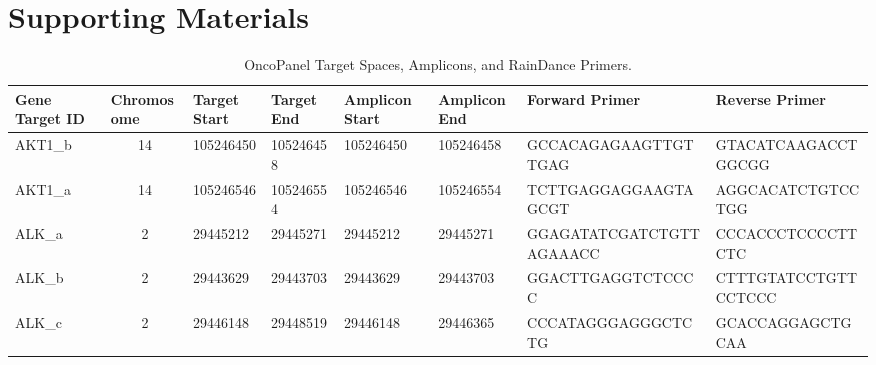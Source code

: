 \chapter{Supporting Materials}

\footnotesize
\begin{landscape}
\setlength\LTleft{0pt}
\setlength\LTright{0pt}
\begin{longtable}{| p{} | p{} | p{} | p{} | p{} | p{} | p{} | p{} |}
\caption{OncoPanel Target Spaces, Amplicons, and RainDance Primers.}
\label{tbl:amplicon:list}
\hline
\textbf{Gene Target ID}          & \textbf{Chromosome}     & \textbf{Target Start}          & \textbf{Target End}            & \textbf{Amplicon Start}        & \textbf{Amplicon End}          & \textbf{Forward Primer}                              & \textbf{Reverse Primer}                            \\ \hline
\multicolumn{1}{|l|}{AKT1\_b}    & \multicolumn{1}{c|}{14} & \multicolumn{1}{l|}{105246450} & \multicolumn{1}{l|}{105246458} & \multicolumn{1}{l|}{105246450} & \multicolumn{1}{l|}{105246458} & \multicolumn{1}{l|}{GCCACAGAGAAGTTGTTGAG}            & \multicolumn{1}{l|}{GTACATCAAGACCTGGCGG}           \\ \hline
\multicolumn{1}{|l|}{AKT1\_a}    & \multicolumn{1}{c|}{14} & \multicolumn{1}{l|}{105246546} & \multicolumn{1}{l|}{105246554} & \multicolumn{1}{l|}{105246546} & \multicolumn{1}{l|}{105246554} & \multicolumn{1}{l|}{TCTTGAGGAGGAAGTAGCGT}            & \multicolumn{1}{l|}{AGGCACATCTGTCCTGG}             \\ \hline
\multicolumn{1}{|l|}{ALK\_a}     & \multicolumn{1}{c|}{2}  & \multicolumn{1}{l|}{29445212}  & \multicolumn{1}{l|}{29445271}  & \multicolumn{1}{l|}{29445212}  & \multicolumn{1}{l|}{29445271}  & \multicolumn{1}{l|}{GGAGATATCGATCTGTTAGAAACC}        & \multicolumn{1}{l|}{CCCACCCTCCCCTTCTC}             \\ \hline
\multicolumn{1}{|l|}{ALK\_b}     & \multicolumn{1}{c|}{2}  & \multicolumn{1}{l|}{29443629}  & \multicolumn{1}{l|}{29443703}  & \multicolumn{1}{l|}{29443629}  & \multicolumn{1}{l|}{29443703}  & \multicolumn{1}{l|}{GGACTTGAGGTCTCCCC}               & \multicolumn{1}{l|}{CTTTGTATCCTGTTCCTCCC}          \\ \hline
\multicolumn{1}{|l|}{ALK\_c}     & \multicolumn{1}{c|}{2}  & \multicolumn{1}{l|}{29446148}  & \multicolumn{1}{l|}{29448519}  & \multicolumn{1}{l|}{29446148}  & \multicolumn{1}{l|}{29446365}  & \multicolumn{1}{l|}{CCCATAGGGAGGGCTCTG}              & \multicolumn{1}{l|}{GCACCAGGAGCTGCAA}              \\ \hline

\end{longtable}
\end{landscape}
